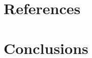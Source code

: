 \documentclass[conference]{IEEEtran}
\begin{document}
\section{References}



\section{Conclusions}
\end{document}
